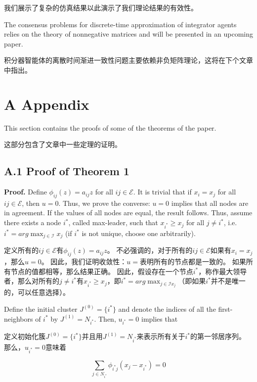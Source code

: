\documentclass{article}
\begin{document}
我们展示了复杂的仿真结果以此演示了我们理论结果的有效性。

{\color[gray]{0.5}
The consensus problems for discrete-time approximation of integrator agents relies on the theory of nonnegative matrices and will be presented in an upcoming paper.
}

积分器智能体的离散时间渐进一致性问题主要依赖非负矩阵理论，这将在下个文章中指出。

\section*{A Appendix}
{\color[gray]{0.5}
This section contains the proofs of some of the theorems of the paper.
}

这部分包含了文章中一些定理的证明。

\subsection*{A.1 Proof of Theorem 1}
{\color[gray]{0.5}
\noindent \textbf{Proof.} Deﬁne $\phi_{ij}(z) = a_{ij}z$ for all $ij \in \mathcal{E}$. 
It is trivial that if $x_i=x_j$ for all $ij \in \mathcal{E}$, then $u=0$. 
Thus, we prove the converse: $u=0$ implies that all nodes are in agreement. 
If the values of all nodes are equal, the result follows. 
Thus, assume there exists a node $i^*$, called max-leader, such that $x_{i^*}\ge x_j$ for all $j\ne i^*$, i.e. $i^* = arg\max_{j\in \mathcal{I}} x_j$ (if $i^*$ is not unique, choose one arbitrarily).
}

\noindent 定义所有的$ij \in \mathcal{E}$有$\phi_{ij}(z) = a_{ij}z$。
不必强调的，对于所有的$ij \in \mathcal{E}$如果有$x_i = x_j$，那么$u=0$。
因此，我们证明收敛性：$u=$表明所有的节点都是一致的。
如果所有节点的值都相等，那么结果正确。
因此，假设存在一个节点$i^*$，称作最大领导者，那么对所有的$j\ne i^*$有$x_{i^*}\ge x_j$，即$i^* = arg\max_{j\in \mathcal{I} x_j}$（即如果$i^*$并不是唯一的，可以任意选择）。

{\color[gray]{0.5}
Deﬁne the initial cluster $J^{(0)}=\{ i^* \}$ and denote the indices of all the ﬁrst-neighbors of $i^*$ by $J^{(1)}=N_{i^*}$. 
Then, $u_{i^*}=0$ implies that
}

定义初始化簇$J^{(0)}=\{ i^* \}$并且用$J^{(1)}=N_{i^*}$来表示所有关于$i^*$的第一邻居序列。
那么，$u_{i^*}=0$意味着

\begin{equation}
    \tag{45}
    \label{45}
    \sum_{j\in N_{i^*}} \phi_{i^*j}(x_j-x_{i^*}) = 0
\end{equation}
\end{document}
